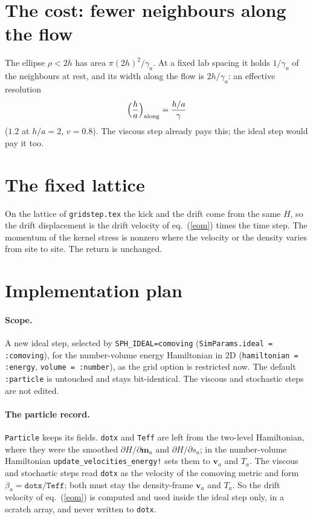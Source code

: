 \documentclass[11pt,aps,preprint,nofootinbib,superscriptaddress,tightenlines]{revtex4-2}
\def\st{\begin{equation}}
\def\stp{\end{equation}}
\def\Eq#1{eq.~(\ref{#1})}
\let\oldparagraph\paragraph
\renewcommand{\paragraph}{\par\bigskip\oldparagraph}
\begin{document}
\section{The cost: fewer neighbours along the flow}
\label{sec:cost}

The ellipse $\rho<2h$ has area $\pi(2h)^2/\gamma_a$.  At a fixed lab spacing it holds $1/\gamma_a$ of the neighbours at rest, and its width
along the flow is $2h/\gamma_a$: an effective resolution
\st
\Big(\frac ha\Big)_{\rm along}=\frac{h/a}{\gamma}
\stp
($1.2$ at $h/a=2$, $v=0.8$).  The viscous step already pays this; the ideal step would pay it too.

\section{The fixed lattice}
\label{sec:grid}

On the lattice of \texttt{gridstep.tex} the kick and the drift come from the same $H$, so the drift displacement is the drift velocity
of \Eq{eom} times the time step.  The momentum of the kernel stress is nonzero where the velocity or the density varies from site to
site.  The return is unchanged.

\section{Implementation plan}
\label{sec:plan}

\paragraph{Scope.}  A new ideal step, selected by \texttt{SPH\_IDEAL=comoving} (\texttt{SimParams.ideal = :comoving}), for the number-volume
energy Hamiltonian in 2D (\texttt{hamiltonian = :energy}, \texttt{volume = :number}), as the grid option is restricted now.  The default
\texttt{:particle} is untouched and stays bit-identical.  The viscous and stochastic steps are not edited.

\paragraph{The particle record.}  \texttt{Particle} keeps its fields.  \texttt{dotx} and \texttt{Teff} are left from the two-level
Hamiltonian, where they were the smoothed $\partial H/\partial\bm m_a$ and $\partial H/\partial s_a$; in the number-volume Hamiltonian
\texttt{update\_velocities\_energy!} sets them to $\bm v_a$ and $T_a$.  The viscous and stochastic steps read \texttt{dotx} as the
velocity of the comoving metric and form $\beta_a=\texttt{dotx}/\texttt{Teff}$; both must stay the density-frame $\bm v_a$ and $T_a$.  So
the drift velocity of \Eq{eom} is computed and used inside the ideal step only, in a scratch array, and never written to
\texttt{dotx}.
\end{document}
